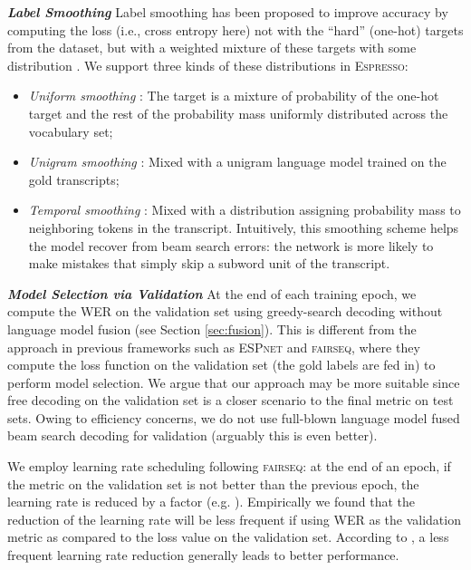 \documentclass{article}
\def\espresso{\textsc{Espresso}\xspace}
\def\fairseq{\textsc{fairseq}\xspace}
\def\espnet{\textsc{ESPnet}\xspace}
\begin{document}
\vspace{0.2cm}
\noindent \textbf{\textit{Label Smoothing}}\quad
Label smoothing \cite{szegedy2016rethinking} has been proposed to improve accuracy by computing the loss (i.e., cross entropy here) not with the ``hard'' (one-hot) targets from the dataset, but with a weighted mixture of these targets with some distribution \cite{mueller2019labelsmoothing}. We support three kinds of these distributions in \espresso:
\begin{itemize} \setlength\itemsep{0cm}
    \item \emph{Uniform smoothing} \cite{szegedy2016rethinking}: The target is a mixture of  probability of the one-hot target and the rest of the  probability mass uniformly distributed across the vocabulary set;
    \item \emph{Unigram smoothing} \cite{pereyra2017regularizing}: Mixed with a unigram language model trained on the gold transcripts;
    \item \emph{Temporal smoothing} \cite{chorowski2017towards}: Mixed with a distribution assigning probability mass to neighboring tokens in the transcript. Intuitively, this smoothing scheme helps the model recover from beam search errors: the network is more likely to make mistakes that simply skip a subword unit of the transcript.
\end{itemize}



\vspace{0.2cm}
\noindent \textbf{\textit{Model Selection via Validation}}\quad
At the end of each training epoch, we compute the WER on the validation set using greedy-search decoding without language model fusion (see Section \ref{sec:fusion}). This is different from the approach in previous frameworks such as \espnet and \fairseq, where they compute the loss function on the validation set (the gold labels are fed in) to perform model selection. We argue that our approach may be more suitable since free decoding on the validation set is a closer scenario to the final metric on test sets. Owing to efficiency concerns, we do not use full-blown language model fused beam search decoding for validation (arguably this is even better).

We employ learning rate scheduling following \fairseq: at the end of an epoch, if the metric on the validation set is not better than the previous epoch, the learning rate is reduced by a factor (e.g. ). Empirically we found that the reduction of the learning rate will be less frequent if using WER as the validation metric as compared to the loss value on the validation set. According to \cite{specaugment}, a less frequent learning rate reduction generally leads to better performance.
\end{document}
